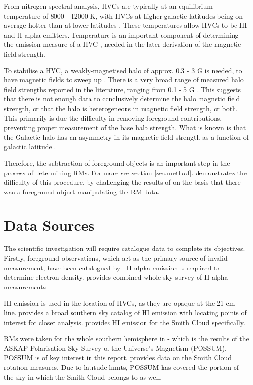 From nitrogen spectral analysis, HVCs are typically at an equilibrium temperature of 8000 - 12000 K, with HVCs at higher galactic latitudes being on-average hotter than at lower latitudes \cite{ID48, ID49}. These temperatures allow HVCs to be HI and H-alpha emitters. Temperature is an important component of determining the emission measure of a HVC \cite{ID5, ID26, ID30}, needed in the later derivation of the magnetic field strength.

To stabilise a HVC, a weakly-magnetised halo of approx. 0.3 - 3 {\textmu}G is needed, to have magnetic fields to sweep up \cite{ID13}. There is a very broad range of measured halo field strengths reported in the literature, ranging from 0.1 - 5 {\textmu}G \cite{ID4, ID16, ID21, ID30, ID37, ID42}. This suggests that there is not enough data to conclusively determine the halo magnetic field strength, or that the halo is heterogeneous in magnetic field strength, or both. This primarily is due the difficulty in removing foreground contributions, preventing proper measurement of the base halo strength. What is known is that the Galactic halo has an asymmetry in its magnetic field strength as a function of galactic latitude \cite{ID16, ID30, ID21}.

Therefore, the subtraction of foreground objects is an important step in the process of determining RMs. For more see section \ref{sec:method}. \citep{ID36} demonstrates the difficulty of this procedure, by challenging the results of \citep{ID2} on the basis that there was a foreground object manipulating the RM data.

\section{Data Sources}
\label{sec:sources}

The scientific investigation will require catalogue data to complete its objectives. Firstly, foreground observations, which act as the primary source of invalid measurement, have been catalogued by \citep{ID44, ID45}. H-alpha emission is required to determine electron density. \citep{ID43} provides combined whole-sky survey of H-alpha measurements.

HI emission is used in the location of HVCs, as they are opaque at the 21 cm line. \citep{ID3, ID6} provides a broad southern sky catalog of HI emission with \citep{ID3} locating points of interest for closer analysis. \citep{ID28} provides HI emission for the Smith Cloud specifically.

RMs were taken for the whole southern hemisphere in \citep{ID1} - which is the results of the ASKAP Polarisation Sky Survey of the Universe's Magnetism (POSSUM). POSSUM is of key interest in this report. \citep{ID18} provides data on the Smith Cloud rotation measures. Due to latitude limits, POSSUM has covered the portion of the sky in which the Smith Cloud belongs to as well.

